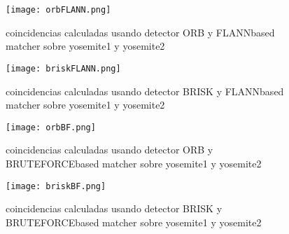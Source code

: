 \begin{figure}[H] %
\centering
\texttt{[image: orbFLANN.png]}  %
\label{figura1}
\caption{coincidencias calculadas usando detector ORB y FLANNbased matcher sobre yosemite1 y yosemite2}
\end{figure}

\begin{figure}[H] %
\centering
\texttt{[image: briskFLANN.png]}  %
\label{figura1}
\caption{coincidencias calculadas usando detector BRISK y FLANNbased matcher sobre yosemite1 y yosemite2}
\end{figure}

\begin{figure}[H] %
\centering
\texttt{[image: orbBF.png]}  %
\label{figura1}
\caption{coincidencias calculadas usando detector ORB y BRUTEFORCEbased matcher sobre yosemite1 y yosemite2}
\end{figure}

\begin{figure}[H] %
\centering
\texttt{[image: briskBF.png]}  %
\label{figura1}
\caption{coincidencias calculadas usando detector BRISK y BRUTEFORCEbased matcher sobre yosemite1 y yosemite2}
\end{figure}

